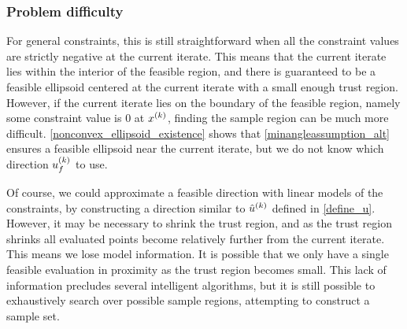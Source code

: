 \subsubsection{Problem difficulty}

For general constraints, this is still straightforward when all the constraint values are strictly negative at the current iterate.
This means that the current iterate lies within the interior of the feasible region,
and there is guaranteed to be a feasible ellipsoid centered at the current iterate with a small enough trust region.
However, if the current iterate lies on the boundary of the feasible region, namely some constraint value is $0$ at $x^{(k)}$, finding the sample region can be much more difficult.
\cref{nonconvex_ellipsoid_existence} shows that \cref{minangleassumption_alt} ensures a feasible ellipsoid near the current iterate,
but we do not know which direction ${u^{(k)}_f}$ to use.

Of course, we could approximate a feasible direction with linear models of the constraints, by constructing a direction similar to ${{\hat u}^{(k)}}$ defined in \cref{define_u}.
However, it may be necessary to shrink the trust region, and as the trust region shrinks all evaluated points become relatively further from the current iterate.
This means we lose model information.
It is possible that we only have a single feasible evaluation in proximity as the trust region becomes small.
This lack of information precludes several intelligent algorithms,
but it is still possible to exhaustively search over possible sample regions, attempting to construct a sample set.


